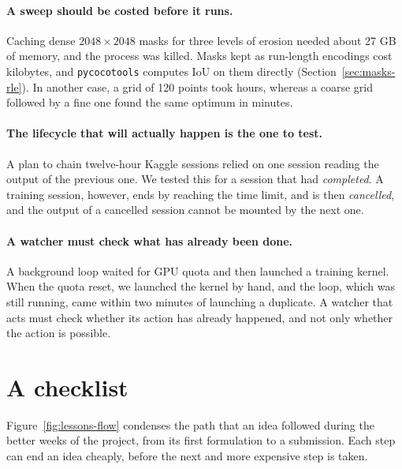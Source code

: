 \paragraph{A sweep should be costed before it runs.} Caching dense $2048\times2048$ masks for three levels
of erosion needed about 27 GB of memory, and the process was killed. Masks kept as run-length encodings
cost kilobytes, and \texttt{pycocotools} computes IoU on them directly (Section~\ref{sec:masks-rle}). In
another case, a grid of 120 points took hours, whereas a coarse grid followed by a fine one found the
same optimum in minutes.

\paragraph{The lifecycle that will actually happen is the one to test.} A plan to chain twelve-hour
Kaggle sessions relied on one session reading the output of the previous one. We tested this for a
session that had \emph{completed}. A training session, however, ends by reaching the time limit, and is
then \emph{cancelled}, and the output of a cancelled session cannot be mounted by the next one.

\paragraph{A watcher must check what has already been done.} A background loop waited for GPU quota and
then launched a training kernel. When the quota reset, we launched the kernel by hand, and the loop,
which was still running, came within two minutes of launching a duplicate. A watcher that acts must check
whether its action has already happened, and not only whether the action is possible.

\section{A checklist}\label{sec:lessons-checklist}
Figure~\ref{fig:lessons-flow} condenses the path that an idea followed during the better weeks of the
project, from its first formulation to a submission. Each step can end an idea cheaply, before the next
and more expensive step is taken.

